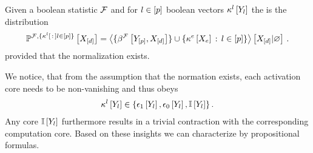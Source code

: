 \begin{definition}[\HardLogicNetwork{}]
    \label{def:hardLogicNetwork}
    Given a boolean statistic $\mathcal{F}$ and for $l\in[p]$ boolean vectors $\kappa^{l}\left[Y_{l}\right]$ the \HardLogicNetwork{} is the distribution
    \begin{align*}
        \mathbb{P}^{\mathcal{F},\{\kappa^{l}\left[\,:\,\right]l\in[p]\}}\left[X_{[d]}\right] =
        \left\langle 
            \{\beta^{\mathcal{F}}\left[Y_{[p]},X_{[d]}\right]\} \cup
            \{\kappa^{e}\left[X_{e}\right]\,:\,l\in[p]\}
        \right\rangle \left[ X_{[d]} | \varnothing \right] \, .
    \end{align*}
    provided that the normalization exists.
\end{definition}

We notice, that from the assumption that the normation exists, each activation core needs to be non-vanishing and thus obeys
\begin{align*}
    \kappa^{l}\left[Y_{l}\right]\in\{\epsilon_1\left[Y_{l}\right],\epsilon_0\left[Y_{l}\right],\mathbb{I}\left[Y_{l}\right]\}    \, .
\end{align*}
Any core $\mathbb{I}\left[Y_{l}\right]$ furthermore results in a trivial contraction with the corresponding computation core.
Based on these insights we can characterize \HardLogicNetworks{} by propositional formulas.

